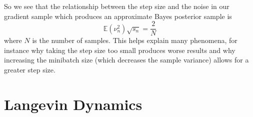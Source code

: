 So we see that the relationship between the step size and the noise in our gradient sample which produces
an approximate Bayes posterior sample is
\begin{equation}
 \mathbb{E}(\nu_n^2)\sqrt{s_n} = \frac{2}{N}
\end{equation}
where $N$ is the number of samples. This helps explain many phenomena, for instance why taking the step size too small produces
worse results and why increasing the minibatch size (which decreases the sample variance) allows for a greater step size.

\section{Langevin Dynamics}